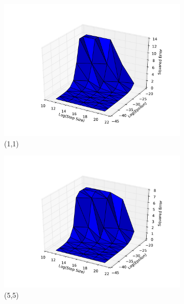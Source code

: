 \documentclass[10pt,psamsfonts]{amsart}
\theoremstyle{definition}
\theoremstyle{remark}
\numberwithin{equation}{section}
\begin{document}
\begin{figure}[b]
	\centering
	\begin{subfigure}[b]{0.23\textwidth}
	\includegraphics[width=\textwidth]{hw1_1-1_0.pdf}
	\caption{(1,1)}
	\end{subfigure}
\begin{subfigure}[b]{0.23\textwidth}
	\includegraphics[width=\textwidth]{hw1_1-1_1.pdf}
	\caption{(5,5)}
\end{subfigure}
\begin{subfigure}[b]{0.23\textwidth}

\end{subfigure}
\end{figure}
\end{document}
